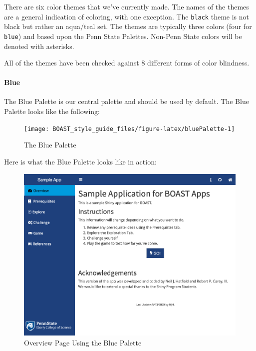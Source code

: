 \documentclass[
]{book}
\begin{document}
There are six color themes that we've currently made. The names of the themes are a general indication of coloring, with one exception. The \texttt{black} theme is not black but rather an aqua/teal set. The themes are typically three colors (four for \texttt{blue}) and based upon the Penn State Palettes. Non-Penn State colors will be denoted with asterisks.

All of the themes have been checked against 8 different forms of color blindness.

\hypertarget{blue}{%
\paragraph{Blue}\label{blue}}

The Blue Palette is our central palette and should be used by default. The Blue Palette looks like the following:

\begin{figure}

{\centering \texttt{[image: BOAST\_style\_guide\_files/figure-latex/bluePalette-1]} 

}

\caption{The Blue Palette}\label{fig:bluePalette}
\end{figure}

Here is what the Blue Palette looks like in action:

\begin{figure}

{\centering \includegraphics[width=13.26in]{images/blueOverview} 

}

\caption{Overview Page Using the Blue Palette}\label{fig:blueAction1}
\end{figure}
\end{document}
